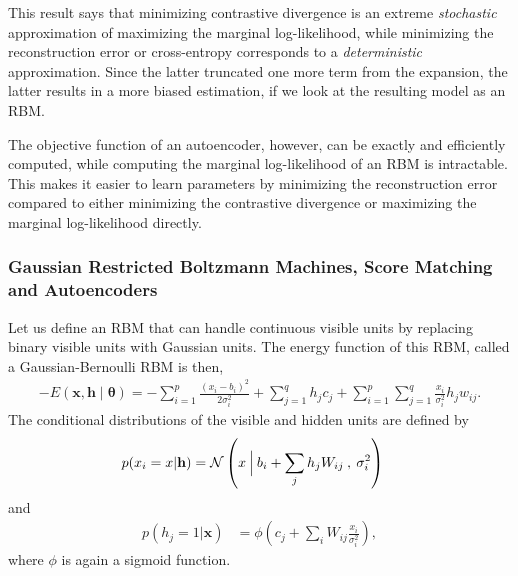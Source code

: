 \documentclass[dissertation,nocontribution]{aaltoseries}
\newcommand{\vect}[1]{\mathbf{#1}}
\newcommand{\vects}[1]{\boldsymbol{#1}}
\newcommand{\vh}[0]{\vect{h}}
\newcommand{\vx}[0]{\vect{x}}
\newcommand{\TT}[0]{{\vects{\theta}}}
\newcommand{\N}[0]{\mathcal{N}}
\begin{document}
This result says that minimizing contrastive divergence is
an extreme \textit{stochastic} approximation of maximizing
the marginal log-likelihood, while minimizing the
reconstruction error or cross-entropy corresponds to a
\textit{deterministic} approximation. Since the latter
truncated one more term from the expansion, the latter
results in a more biased estimation, if we look at
the resulting model as an RBM. 

The objective function of an autoencoder, however,
    can be exactly and
efficiently computed, while computing the marginal
log-likelihood of an RBM is intractable. This makes it
easier to learn parameters by minimizing the reconstruction
error compared to either minimizing the contrastive
divergence or maximizing the marginal log-likelihood
directly.

\subsubsection{Gaussian Restricted Boltzmann Machines, Score
Matching and Autoencoders}
\label{sec:grbm}

Let us define an RBM that can handle continuous visible
units by replacing binary visible units with Gaussian units.
The energy function of this RBM, called a Gaussian-Bernoulli
RBM \citep[GRBM,][]{Hinton2006} is then,
\begin{align}
    \label{eq:grbm_energy}
    -E(\vx, \vh \mid \TT) = -\sum_{i=1}^p \frac{(x_i -
    b_i)^2}{2\sigma_i^2} + \sum_{j=1}^q h_j c_j +
    \sum_{i=1}^p \sum_{j=1}^q \frac{x_i}{\sigma_i^2} h_j
    w_{ij}.
\end{align}
The conditional distributions of the visible and hidden
units are defined by
\begin{align}
    \label{grbm:conditional_visible}
    p(x_i = x | \vh) &= \N \left(x \:\Bigl|\: b_i + 
    \sum_j h_j W_{ij} \:,\: \sigma_i^2 \right)
\end{align}
and
\begin{align}
    \label{grbm:conditional_hidden}
    p(h_j = 1 | \vx) &= \phi \left( c_j +  \sum_i W_{ij}
    \frac{x_i}{\sigma_i^2} \right),
\end{align}
where $\phi$ is again a sigmoid function.
\end{document}
